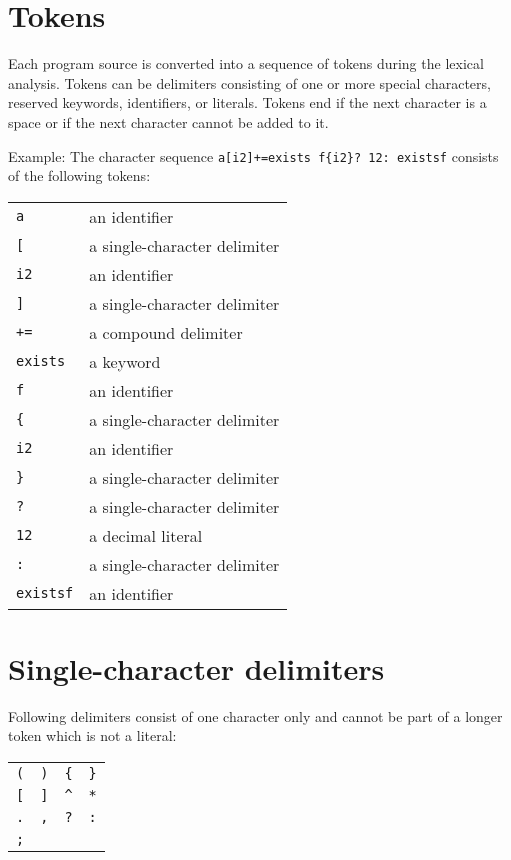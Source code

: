 \section{Tokens}

Each program source is converted into a sequence of tokens during
the lexical analysis. Tokens can be
delimiters consisting of one or more special
characters, reserved keywords,
identifiers, or literals. Tokens end if
the next character is a space or if the next character cannot be added
to it.

Example: The character sequence \lstinline!a[i2]+=exists f{i2}? 12: existsf!
consists of the following tokens:

\begin{tabular}{l l}
   \lstinline!a! & an identifier \\
   \lstinline![! & a single-character delimiter \\
   \lstinline!i2! & an identifier \\
   \lstinline!]! & a single-character delimiter \\
   \lstinline!+=! & a compound delimiter \\
   \lstinline!exists! & a keyword \\
   \lstinline!f! & an identifier \\
   \lstinline!{! & a single-character delimiter \\
   \lstinline!i2! & an identifier \\
   \lstinline!}! & a single-character delimiter \\
   \lstinline!?! & a single-character delimiter \\
   \lstinline!12! & a decimal literal \\
   \lstinline!:! & a single-character delimiter \\
   \lstinline!existsf! & an identifier \\
\end{tabular}

\section{Single-character delimiters}

Following delimiters consist of one character only and cannot
be part of a longer token which is not a literal:

\bigskip
\noindent
\begin{tabular}{l l l l}
   \lstinline!(! & \lstinline!)! & \lstinline!{! & \lstinline!}! \\
   \lstinline![! & \lstinline!]! & \lstinline!^! & \lstinline!*! \\
   \lstinline!.! & \lstinline!,! & \lstinline!?! & \lstinline!:! \\
   \lstinline!;! \\
\end{tabular}

